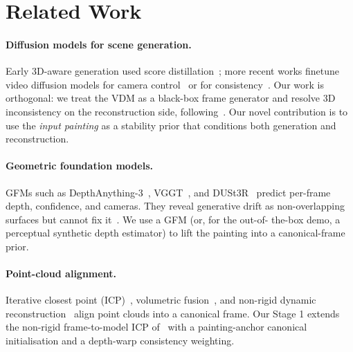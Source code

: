 
\section{Related Work}
\label{sec:related}

\paragraph{Diffusion models for scene generation.}
Early 3D-aware generation used score distillation~\cite{dreamfusion,magic3d};
more recent works finetune video diffusion models for camera
control~\cite{viewcrafter,gen3c,seva,cameractrl} or for
consistency~\cite{consisti2v}. Our work is orthogonal: we treat the VDM as a
black-box frame generator and resolve 3D inconsistency on the reconstruction
side, following~\cite{hoellein2026worldreconstruction,worldexplorer}. Our
novel contribution is to use the \emph{input painting} as a stability prior
that conditions both generation and reconstruction.

\paragraph{Geometric foundation models.}
GFMs such as DepthAnything-3~\cite{da3}, VGGT~\cite{vggt}, and
DUSt3R~\cite{dust3r} predict per-frame depth, confidence, and cameras. They
reveal generative drift as non-overlapping surfaces but cannot fix
it~\cite{hoellein2026worldreconstruction}. We use a GFM (or, for the out-of-
the-box demo, a perceptual synthetic depth estimator) to lift the painting
into a canonical-frame prior.

\paragraph{Point-cloud alignment.}
Iterative closest point (ICP)~\cite{icp,coloredicp}, volumetric
fusion~\cite{kinectfusion}, and non-rigid dynamic
reconstruction~\cite{dynamicfusion} align point clouds into a canonical frame.
Our Stage 1 extends the non-rigid frame-to-model ICP
of~\cite{hoellein2026worldreconstruction} with a painting-anchor canonical
initialisation and a depth-warp consistency weighting.

